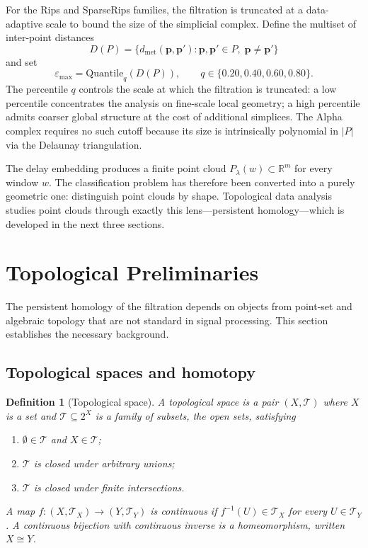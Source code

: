 \documentclass[onluarkali,ingilizce,yukseklisans,karton,LisansustuEgitim]{itutez}
\newtheorem{definition}{Definition}[chapter]
\providecommand{\R}{\mathbb{R}}
\providecommand{\1}{\mathbf{1}}
\begin{document}
For the Rips and SparseRips families, the filtration is truncated at a data-adaptive scale to bound the size of the simplicial complex. Define the multiset of inter-point distances
\[
  D(P)=\bigl\{d_{\mathrm{met}}(\mathbf{p},\mathbf{p}'):\mathbf{p},\mathbf{p}'\in P,\;\mathbf{p}\neq\mathbf{p}'\bigr\}
\]
and set
\begin{equation}
  \varepsilon_{\max}=\mathrm{Quantile}_q(D(P)),
  \qquad
  q\in\{0.20,0.40,0.60,0.80\}.
  \label{eq:eps_max}
\end{equation}
The percentile $q$ controls the scale at which the filtration is truncated: a low percentile concentrates the analysis on fine-scale local geometry; a high percentile admits coarser global structure at the cost of additional simplices. The Alpha complex requires no such cutoff because its size is intrinsically polynomial in $|P|$ via the Delaunay triangulation.

The delay embedding produces a finite point cloud $P_\lambda(w)\subset\R^m$ for every window $w$. The classification problem has therefore been converted into a purely geometric one: distinguish point clouds by shape. Topological data analysis studies point clouds through exactly this lens---persistent homology---which is developed in the next three sections.

\section{Topological Preliminaries}
\label{subsec:topological_prelim}

The persistent homology of the filtration depends on objects from point-set and algebraic topology that are not standard in signal processing. This section establishes the necessary background.

\subsection{Topological spaces and homotopy}

\begin{definition}[Topological space]
\label{def:topspace}
A \emph{topological space} is a pair $(X,\mathcal{T})$ where $X$ is a set and $\mathcal{T}\subseteq 2^X$ is a family of subsets, the \emph{open sets}, satisfying
\begin{enumerate}[label=(\roman*)]
  \item $\emptyset\in\mathcal{T}$ and $X\in\mathcal{T}$;
  \item $\mathcal{T}$ is closed under arbitrary unions;
  \item $\mathcal{T}$ is closed under finite intersections.
\end{enumerate}
A map $f\colon(X,\mathcal{T}_X)\to(Y,\mathcal{T}_Y)$ is \emph{continuous} if $f^{-1}(U)\in\mathcal{T}_X$ for every $U\in\mathcal{T}_Y$. A continuous bijection with continuous inverse is a \emph{homeomorphism}, written $X\cong Y$.
\end{definition}
\end{document}
